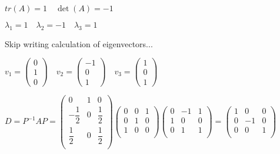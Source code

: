 \documentclass[12pt,letterpaper]{article}
\begin{document}
\begin{enumerate}[label=(\alph*)]
        $tr(A) = 1\quad\det(A) = -1$
        
        $\lambda_1 = 1\quad\lambda_2 = -1\quad\lambda_3 = 1$
        
        Skip writing calculation of eigenvectors...
        
        $v_1 = \begin{pmatrix} 0 \\ 1 \\ 0 \end{pmatrix}\quad
         v_2 = \begin{pmatrix} -1 \\ 0 \\ 1 \end{pmatrix}\quad
         v_3 = \begin{pmatrix} 1 \\ 0 \\ 1 \end{pmatrix}$
         
         $D = P^{-1}AP = \begin{pmatrix}
            0 & 1 & 0 \\
            -\dfrac{1}{2} & 0 & \dfrac{1}{2} \\
            \dfrac{1}{2} & 0 & \dfrac{1}{2} \\
        \end{pmatrix}\begin{pmatrix}
            0 & 0 & 1 \\
            0 & 1 & 0 \\
            1 & 0 & 0 \\
        \end{pmatrix}\begin{pmatrix}
            0 & -1 & 1 \\
            1 & 0 & 0 \\
            0 & 1 & 1 \\
        \end{pmatrix} = \begin{pmatrix}
            1 & 0 & 0 \\
            0 & -1 & 0 \\
            0 & 0 & 1 \\
        \end{pmatrix}$
    \end{enumerate}
    
\end{document}
